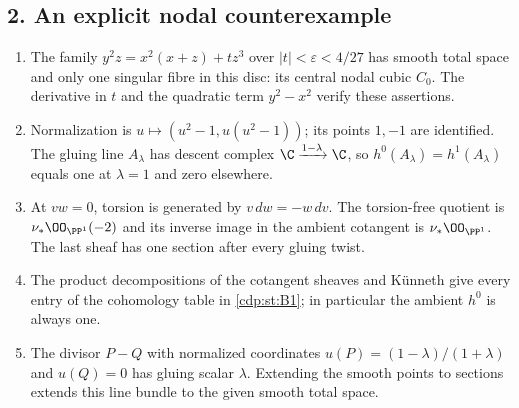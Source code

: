 \subsection*{2. An explicit nodal counterexample}
\RungOne
\begin{enumerate}[label=\arabic*.,leftmargin=*]
\item The family
$y^2z=x^2(x+z)+tz^3$ over $|t|<\varepsilon<4/27$ has smooth
total space and only one singular fibre in this disc: its central
nodal cubic $C_0$.  The derivative in $t$ and the quadratic term
$y^2-x^2$ verify these assertions.
\item Normalization is $u\mapsto(u^2-1,u(u^2-1))$; its points
$1,-1$ are identified.  The gluing line $A_\lambda$ has descent
complex $\C\xrightarrow{1-\lambda}\C$, so
$h^0(A_\lambda)=h^1(A_\lambda)$ equals one at $\lambda=1$ and
zero elsewhere.
\item At $vw=0$, torsion is generated by $v\,dw=-w\,dv$.
The torsion-free quotient is $\nu_*\OO_{\PP^1}(-2)$ and its
inverse image in the ambient cotangent is $\nu_*\OO_{\PP^1}$.
The last sheaf has one section after every gluing twist.
\item The product decompositions of the cotangent sheaves and
K\"unneth give every entry of the cohomology table in
\ref{cdp:st:B1}; in particular the ambient $h^0$ is always one.
\item The divisor $P-Q$ with normalized coordinates
$u(P)=(1-\lambda)/(1+\lambda)$ and $u(Q)=0$ has gluing scalar
$\lambda$.  Extending the smooth points to sections extends this
line bundle to the given smooth total space.
\end{enumerate}

